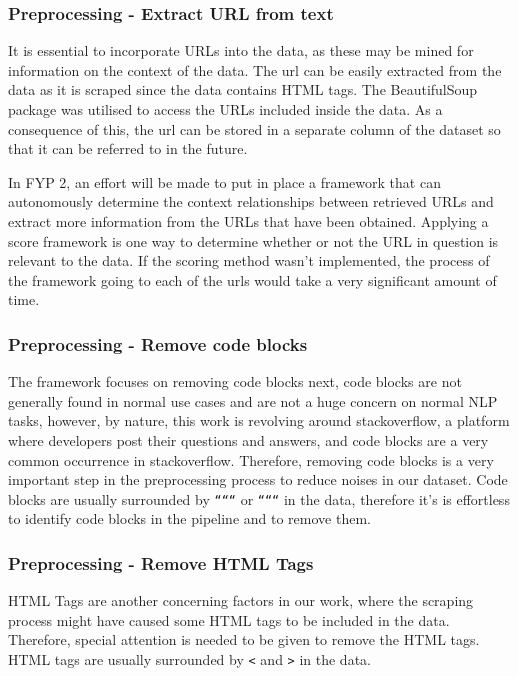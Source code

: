 \subsubsection{Preprocessing - Extract URL from text}
It is essential to incorporate URLs into the data, as these may be mined for information on the context of the data. The url can be easily extracted from the data as it is scraped since the data contains HTML tags. The BeautifulSoup package was utilised to access the URLs included inside the data. As a consequence of this, the url can be stored in a separate column of the dataset so that it can be referred to in the future.

In FYP 2, an effort will be made to put in place a framework that can autonomously determine the context relationships between retrieved URLs and extract more information from the URLs that have been obtained. Applying a score framework is one way to determine whether or not the URL in question is relevant to the data. If the scoring method wasn't implemented, the process of the framework going to each of the urls would take a very significant amount of time.

\subsubsection{Preprocessing - Remove code blocks}
The framework focuses on removing code blocks next, code blocks are not generally found in normal use cases and are not a huge concern on normal NLP tasks, however, by nature, this work is revolving around stackoverflow, a platform where developers post their questions and answers, and code blocks are a very common occurrence in stackoverflow. Therefore, removing code blocks is a very important step in the preprocessing process to reduce noises in our dataset. Code blocks are usually surrounded by \texttt{``````} or \texttt{``````} in the data, therefore it's is effortless to identify code blocks in the pipeline and to remove them.

\subsubsection{Preprocessing - Remove HTML Tags}
HTML Tags are another concerning factors in our work, where the scraping process might have caused some HTML tags to be included in the data. Therefore, special attention is needed to be given to remove the HTML tags.  HTML tags are usually surrounded by \texttt{<} and \texttt{>} in the data.

